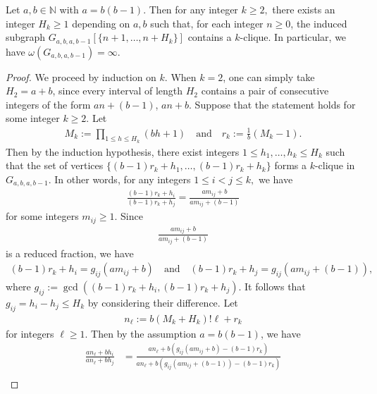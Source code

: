 \documentclass[10pt,a4paper]{amsart}
\renewcommand{\geq}{\geqslant}
\renewcommand{\leq}{\leqslant}
\begin{document}
\begin{proposition} \label{prop:a=b(b-1)}
Let $a, b \in \mathbb{N}$ with $a=b(b-1).$ Then
for any integer $k \geq 2,$ there exists an integer $H_k \geq 1$ depending on $a,b$ such that, for each integer $n\geq 0$, the induced subgraph $G_{a,b,a,b-1}[\{n+1, \ldots, n+H_k\}]$ contains a $k$-clique. In particular, we have $\omega(G_{a,b,a,b-1})=\infty.$
\end{proposition}

\begin{proof}
We proceed by induction on $k$. When \( k = 2 \), one can simply take \( H_2 = a + b \), since every interval of length \( H_2 \) contains a pair of consecutive integers of the form \( an + (b - 1) \), \( an + b \).
 Suppose that the statement holds for some integer $k \geq 2.$ Let 
\begin{align*}
M_k:=\prod_{1 \leq h \leq H_k}(bh+1) \quad \text{and} \quad r_k:=\frac{1}{b}(M_k-1).
\end{align*}
Then by the induction hypothesis, there exist integers $1 \leq h_1, \ldots, h_k \leq H_k$ such that the set of vertices $\{(b-1)r_k+h_1, \ldots, (b-1)r_k+h_k\}$ forms a $k$-clique in $G_{a,b,a,b-1}.$ In other words, for any integers $1 \leq i < j \leq k,$ we have
\begin{align*}
\frac{(b-1)r_k+h_i}{(b-1)r_k+h_j}=\frac{am_{ij}+b}{am_{ij}+(b-1)}
\end{align*}
for some integers $m_{ij} \geq 1.$ Since 
\begin{align*}
\frac{am_{ij}+b}{am_{ij}+(b-1)}
\end{align*}
is a reduced fraction, we have
\begin{gather*}
(b-1)r_k+h_i=g_{ij} (am_{ij}+b) \quad \text{and} \quad
(b-1)r_k+h_j= g_{ij}(am_{ij}+(b-1)),
\end{gather*}
where $g_{ij}:=\gcd((b-1)r_k+h_i, (b-1)r_k+h_j)$. It follows that $g_{ij}= h_i-h_j \leq H_{k}$ by considering their difference.
Let
\begin{align*}
n_{\ell} := b (M_k+H_k)! {\ell}+ r_k %
\end{align*}
for integers ${\ell} \geq 1.$ Then by the assumption $a=b(b-1)$, we have
\begin{align}
\frac{an_{\ell}+bh_i}{an_{\ell}+bh_j} &= \frac{an_{\ell}+b(g_{ij} (am_{ij}+b)-(b-1)r_k)}{an_{\ell}+b(g_{ij}(am_{ij}+(b-1))-(b-1)r_k)} \nonumber \\

\end{align}
\end{proof}
\end{document}
